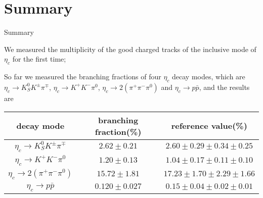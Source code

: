\documentclass{beamer}
\begin{document}
\section{Summary}
\begin{frame}{Summary}
  \begin{block}{}
    We measured the multiplicity of the good charged tracks of the inclusive mode of $\eta_c$ for the first time;
  \end{block}
  \begin{block}{}
    So far we measured the branching fractions of four $\eta_c$ decay modes, which are $\eta_c\to K_S^0 K^{\pm} \pi^{\mp}$, $\eta_c\to K^+K^-\pi^0$, $\eta_c\to 2(\pi^+\pi^-\pi^0)$ and $\eta_c\to p\bar{p}$, and the results are
    \begin{table}[~hbp]\small
      \begin{tabular}{c|c|c}
        \hline
        \hline
        decay mode & branching fraction(\%) & reference value(\%) \footnotemark[1] \\
        \hline
        $\eta_c\to K_S^0K^{\pm}\pi^{\mp}$ & $2.62\pm0.21$ & $2.60\pm0.29\pm0.34\pm0.25$ \\
        $\eta_c\to K^+ K^- \pi^0$ & $1.20\pm0.13$ & $ 1.04\pm0.17\pm0.11\pm0.10$ \\
        $\eta_c\to2(\pi^+\pi^-\pi^0)$ & $15.72\pm1.81$ & $17.23\pm1.70\pm2.29\pm1.66$ \\
        $\eta_c\to p\bar{p}$ & $0.120\pm 0.027$  & $0.15\pm0.04\pm0.02\pm0.01$ \\
        \hline
        \hline
      \end{tabular}
    \end{table}
  \end{block}
\end{frame}
\end{document}

